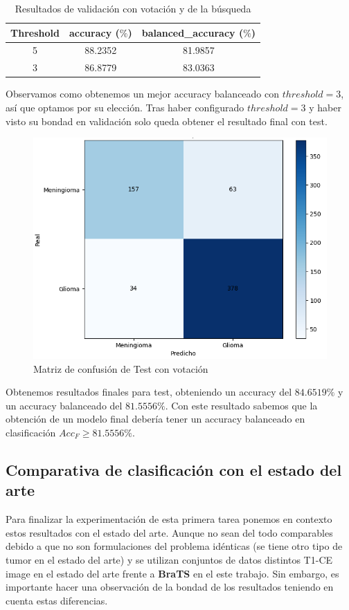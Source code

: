 \begin{table}[H]
	\centering
	\begin{tabular}{|ccc|}
		\toprule
		Threshold & accuracy ($\%$) & balanced\_accuracy ($\%$) \\
		\midrule
		5 & 88.2352 & 81.9857 \\ 
		3 & 86.8779 & 83.0363  \\ 
		\bottomrule
	\end{tabular}
	\caption{Resultados de validación con votación y de la búsqueda}
	\label{tabla:resultados11}
\end{table}

Observamos como obtenemos un mejor accuracy balanceado con $threshold = 3$, así que optamos por su elección.
Tras haber configurado $threshold = 3$ y haber visto su bondad en validación solo queda obtener el resultado final con test.

\begin{figure}[H]
	\centering
	\includegraphics[width=0.8\linewidth]{imagenes/task1_test.png}
	\caption{Matriz de confusión de Test con votación}
\end{figure}

Obtenemos resultados finales para test, obteniendo un accuracy del $84.6519 \%$ y un accuracy balanceado del $81.5556 \%$. Con este resultado sabemos que la obtención de un modelo final debería tener un accuracy balanceado en clasificación $ Acc_{F} \geq 81.5556 \% $.

\subsection{Comparativa de clasificación con el estado del arte}

Para finalizar la experimentación de esta primera tarea ponemos en contexto estos resultados con el estado del arte. Aunque no sean del todo comparables debido a que no son formulaciones del problema idénticas (se tiene otro tipo de tumor en el estado del arte) y se utilizan conjuntos de datos distintos T1-CE image en el estado del arte frente a \textbf{BraTS} en el este trabajo. Sin embargo, es importante hacer una observación de la bondad de los resultados teniendo en cuenta estas diferencias. 

